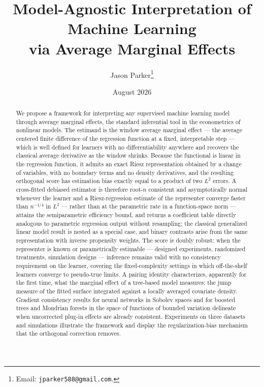 \documentclass[12pt]{article}
\begin{document}
	
	\title{Model-Agnostic Interpretation of Machine Learning\\via Average Marginal Effects}
	\author{Jason Parker\thanks{Email: \texttt{jparker588@gmail.com}.}}
	\date{August 2026}
	
	\maketitle
	\thispagestyle{fancy}
	
	\begin{abstract}
		\noindent We propose a framework for interpreting any supervised machine learning
		model through average marginal effects, the standard inferential tool in the
		econometrics of nonlinear models. The estimand is the window average marginal
		effect --- the average centered finite difference of the regression function
		at a fixed, interpretable step --- which is well defined for learners with no
		differentiability anywhere and recovers the classical average derivative as
		the window shrinks. Because the functional is linear in the regression
		function, it admits an exact Riesz representation obtained by a change of
		variables, with no boundary terms and no density derivatives, and the
		resulting orthogonal score has estimation bias exactly equal to a product of
		two $L^2$ errors. A cross-fitted debiased estimator is therefore root-$n$
		consistent and asymptotically normal whenever the learner and a
		Riesz-regression estimate of the representer converge faster than $n^{-1/4}$
		in $L^2$ --- rather than at the parametric rate in a function-space norm ---
		attains the semiparametric efficiency bound, and returns a coefficient table
		directly analogous to parametric regression output without resampling; the
		classical generalized linear model result is nested as a special case, and
		binary contrasts arise from the same representation with inverse propensity
		weights. The score is doubly robust: when the representer is known or
		parametrically estimable --- designed experiments, randomized treatments,
		simulation designs --- inference remains valid with no consistency
		requirement on the learner, covering the fixed-complexity settings in which
		off-the-shelf learners converge to pseudo-true limits. A pairing identity
		characterizes, apparently for the first time,
		what the marginal effect of a tree-based model measures: the jump measure of
		the fitted surface integrated against a locally averaged covariate density.
		Gradient consistency results for neural networks in Sobolev spaces and for
		boosted trees and Mondrian forests in the space of functions of bounded
		variation delineate when uncorrected plug-in effects are already consistent.
		Experiments on three datasets and simulations illustrate the framework and
		display the regularization-bias mechanism that the orthogonal correction
		removes.
	\end{abstract}
	
\end{document}
